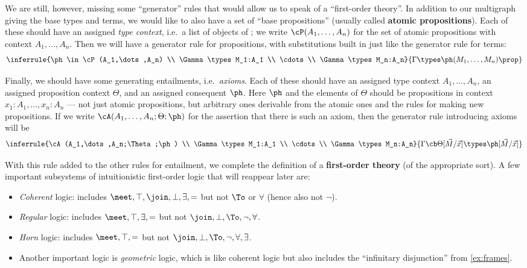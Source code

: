 We are still, however, missing some ``generator'' rules that would allow us to speak of a ``first-order theory''.
In addition to our multigraph \cG giving the base types and terms, we would like to also have a set \cP of ``base propositions'' (usually called \textbf{atomic propositions}).
Each of these should have an assigned \emph{type context}, i.e.\ a list of objects of \cG; we write $\cP(A_1,\dots,A_n)$ for the set of atomic propositions with context $A_1,\dots,A_n$.
Then we will have a generator rule for propositions, with substitutions built in just like the generator rule for terms:
\[ \inferrule{\ph\in \cP(A_1,\dots,A_n) \\ \Gamma\types M_1:A_1 \\ \cdots\\ \Gamma\types M_n:A_n}{\Gamma \types \ph(M_1,\dots,M_n) \prop} \]

Finally, we should have some generating entailments, i.e.\ \emph{axioms}.
Each of these should have an assigned type context $A_1,\dots,A_n$, an assigned proposition context $\Theta$, and an assigned consequent $\ph$.
Here $\ph$ and the elements of $\Theta$ should be propositions in context $x_1:A_1,\dots,x_n:A_n$ --- not just atomic propositions, but arbitrary ones derivable from the atomic ones and the rules for making new propositions.
If we write $\cA(A_1,\dots,A_n;\Theta;\ph)$ for the assertion that there is such an axiom, then the generator rule introducing axioms will be
\[ \inferrule{\cA(A_1,\dots,A_n;\Theta;\ph) \\ \Gamma\types M_1:A_1 \\ \cdots\\ \Gamma\types M_n:A_n}{\Gamma \cb \Theta[\vec M/\vec x]\types \ph[\vec M/\vec x]} \]

With this rule added to the other rules for entailment, we complete the definition of a \textbf{first-order theory} (of the appropriate sort).
A few important subsystems of intuitionistic first-order logic that will reappear later are:
\begin{itemize}
\item \emph{Coherent} logic: includes $\meet,\top,\join,\bot,\exists,=$ but not $\To$ or $\forall$ (hence also not $\neg$).
\item \emph{Regular} logic: includes $\meet,\top,\exists,=$ but not $\join,\bot,\To,\neg,\forall$.
\item \emph{Horn} logic: includes $\meet,\top,=$ but not $\join,\bot,\To,\neg,\forall,\exists$.
\item Another important logic is \emph{geometric} logic, which is like coherent logic but also includes the ``infinitary disjunction'' from \cref{ex:frames}.
\end{itemize}


